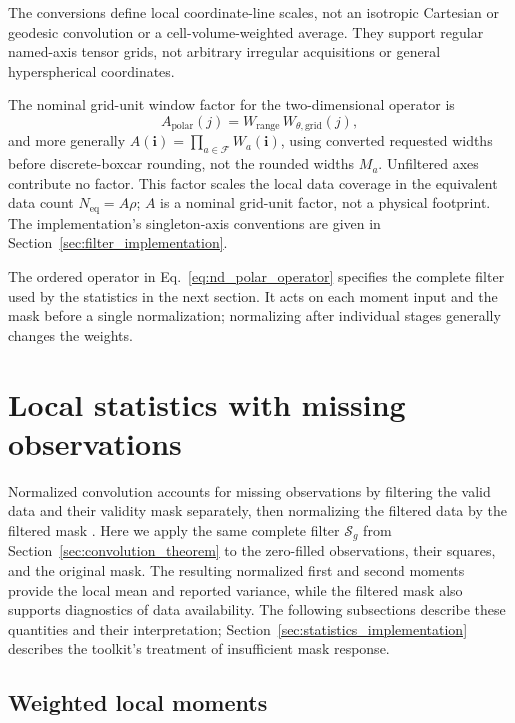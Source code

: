 \documentclass[a4paper,fleqn]{cas-sc}
\begin{document}
The conversions define local coordinate-line scales, not an isotropic Cartesian or geodesic convolution or a cell-volume-weighted average. They support regular named-axis tensor grids, not arbitrary irregular acquisitions or general hyperspherical coordinates.

The nominal grid-unit window factor for the two-dimensional operator is
\begin{equation}
	A_{\mathrm{polar}}(j)=W_{\mathrm{range}}\,W_{\theta,\mathrm{grid}}(j),
	\label{eq:area_polar}
\end{equation}
and more generally $A(\mathbf{i})=\prod_{a\in\mathcal{F}}W_a(\mathbf{i})$, using converted requested widths before discrete-boxcar rounding, not the rounded widths $M_a$. Unfiltered axes contribute no factor. This factor scales the local data coverage in the equivalent data count $N_{\mathrm{eq}}=A\rho$; $A$ is a nominal grid-unit factor, not a physical footprint. The implementation's singleton-axis conventions are given in Section~\ref{sec:filter_implementation}.

The ordered operator in Eq.~\ref{eq:nd_polar_operator} specifies the complete filter used by the statistics in the next section. It acts on each moment input and the mask before a single normalization; normalizing after individual stages generally changes the weights.

\section{Local statistics with missing observations}
\label{sec:nc_statistics}

Normalized convolution accounts for missing observations by filtering the valid data and their validity mask separately, then normalizing the filtered data by the filtered mask \citep{Knutsson1993,Westin1994,Pham2006}. Here we apply the same complete filter $\mathcal{S}_g$ from Section~\ref{sec:convolution_theorem} to the zero-filled observations, their squares, and the original mask. The resulting normalized first and second moments provide the local mean and reported variance, while the filtered mask also supports diagnostics of data availability. The following subsections describe these quantities and their interpretation; Section~\ref{sec:statistics_implementation} describes the toolkit's treatment of insufficient mask response.

\subsection{Weighted local moments}
\end{document}

